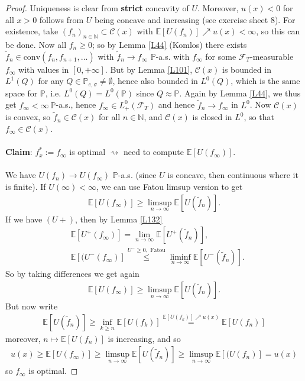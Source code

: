 \documentclass[12pt,a4paper, twoside]{article}
\theoremstyle{definition}
\newcommand{\EE}{\mathbb{E}} %
\newcommand{\PP}{\mathbb{P}} %
\begin{document}
\begin{proof}
Uniqueness is clear from \textbf{strict} concavity of $U$. Moreover, $u(x) <0$ for all $x>0$ follows from $U$ being concave and increasing (see exercise sheet $8$). For existence,  take $(f_n)_{n \in \mathbb{N}} \subset \mathcal{C}(x)$ with $\EE[U(f_n)] \nearrow u(x) < \infty$, so this can be done. Now all $f_n \geq 0$; so by Lemma \ref{L44} (Komlos) there exists $\widetilde{f}_n \in \text{conv}(f_n, f_{n+1}, \dots )$ with $\widetilde{f}_n \to f_\infty$ $\PP$-a.s. with $f_\infty$ for some $\mathcal{F}_T$-measurable $f_\infty$ with values in $[0, + \infty]$. But by Lemma \ref{L101}, $\mathcal{C}(x)$ is bounded in $L^1(Q)$ for any $Q \in \PP_{e, \sigma} \neq \emptyset$, hence also bounded in $L^0(Q)$, which is the same space for $\PP$,  i.e. $L^0(Q)= L^0(\PP)$ since $Q \approx \PP$. Again by Lemma \ref{L44}, we thus get $f_\infty < \infty \ \PP$-a.s., hence $f_\infty \in L_+^0( \mathcal{F}_T)$ and hence $\widetilde{f}_n \to f_\infty$ in $L^0$. 
\newpage
Now $\mathcal{C}(x)$ is convex, so $\widetilde{f}_n \in \mathcal{C}(x)$ for all $n \in \mathbb{N}$, and $\mathcal{C}(x)$ is closed in $L^0$, so that $f_\infty \in \mathcal{C}(x)$. 
\\\\
\textbf{Claim}: $f_x^*:= f_\infty$ is optimal $\rightsquigarrow$ need to compute $\EE[U(f_\infty)]$. \\
\\
We have $U(f_n) \to U(f_\infty)$ $\PP$-a.s. (since $U$ is concave, then continuous where it is finite). If $U( \infty)< \infty$, we can use Fatou limsup version to get 
\begin{align*}
\EE[U(f_\infty)] \geq \limsup_{n \to \infty} \EE[U( \widetilde{f}_n)].
\end{align*}
If we have $(U+)$, then by Lemma \ref{L132} 
\begin{align*}
& \EE[U^+(f_\infty)] = \lim_{n \to \infty} \EE[U^+( \widetilde{f}_n)], \\
& \EE[(U^-( f_\infty)] \overset{U^- \geq 0, \text{ Fatou}} \leq \liminf_{n \to \infty} \EE[U^- ( \widetilde{f}_n)]. 
\end{align*}
So by taking differences we get again 
\begin{align*}
\EE[U(f_\infty)] \geq \limsup_{n \to \infty} \EE[U( \widetilde{f}_n)].
\end{align*}
But now write 
\begin{align*}
\EE[U( \widetilde{f}_n)] \geq \inf_{k \geq n} \EE[U(f_k)] \overset{ \EE[U(f_k)] \nearrow u(x)}= \EE[U(f_n)]
\end{align*}
moreover, $n \mapsto \EE[U(f_n)]$ is increasing,  and so 
\begin{align*}
u(x) \geq \EE[U(f_\infty)] \geq \limsup_{n \to \infty} \EE[U( \widetilde{f}_n)] \geq \limsup_{n \to \infty} \EE[(U(f_n)] = u(x)
\end{align*}
so $f_\infty$ is optimal. 
\end{proof}
\end{document}
